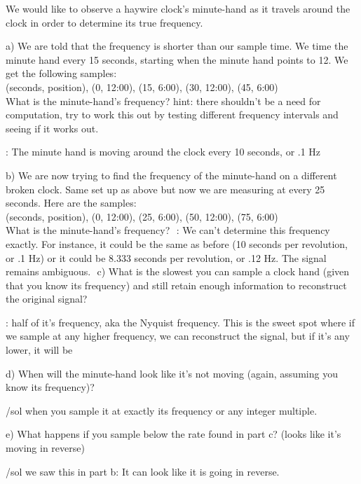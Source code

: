 We would like to observe a haywire clock’s minute-hand as it travels around the clock in order to determine its true frequency.


a) We are told that the frequency is shorter than our sample time. We time the minute hand every 15 seconds, starting when the minute hand points to 12. We get the following samples: \\
	(seconds, position), (0, 12:00), (15, 6:00), (30, 12:00), (45, 6:00) \\
What is the minute-hand’s frequency?
hint: there shouldn’t be a need for computation, try to work this out by testing different frequency intervals and seeing if it works out.

\sol:
The minute hand is moving around the clock every 10 seconds, or .1 Hz


b) We are now trying to find the frequency of the minute-hand on a different broken clock. Same set up as above but now we are measuring at every 25 seconds. Here are the samples: \\
(seconds, position), (0, 12:00), (25, 6:00), (50, 12:00), (75, 6:00) \\
What is the minute-hand’s frequency?
 \sol:
We can’t determine this frequency exactly. For instance, it could be the same as before (10 seconds per revolution, or .1 Hz) or it could be 8.333 seconds per revolution, or .12 Hz. The signal remains ambiguous. 
c) What is the slowest you can sample a clock hand (given that you know its frequency) and still retain enough information to reconstruct the original signal?

\sol: half of it’s frequency, aka the Nyquist frequency. This is the sweet spot where if we sample at any higher frequency, we can reconstruct the signal, but if it’s any lower, it will be  

d) When will the minute-hand look like it’s not moving (again, assuming you know its frequency)?

/sol when you sample it at exactly its frequency or any integer multiple.


e) What happens if you sample below the rate found in part c? (looks like it’s moving in reverse)

/sol we saw this in part b: It can look like it is going in reverse.
